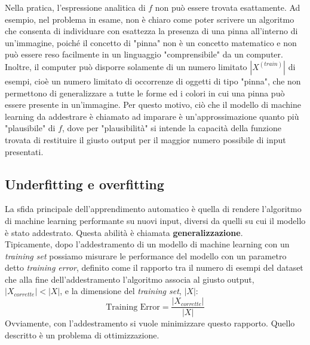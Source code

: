 Nella pratica, l'espressione analitica di $f$ non può essere trovata esattamente. Ad esempio, nel problema in esame, non è chiaro come poter scrivere un algoritmo che consenta di individuare con esattezza la presenza di una pinna all'interno di un'immagine, poiché il concetto di "pinna" non è un concetto matematico e non può essere reso facilmente in un linguaggio "comprensibile" da un computer. Inoltre, il computer può disporre solamente di un numero limitato $\left|X^{(train)}\right|$ di esempi, cioè un numero limitato di occorrenze di oggetti di tipo "pinna", che non permettono di generalizzare a tutte le forme ed i colori in cui una pinna può essere presente in un'immagine. Per questo motivo, ciò che il modello di machine learning da addestrare è chiamato ad imparare è un'approssimazione quanto più "plausibile" di $f$, dove per "plausibilità" si intende la capacità della funzione trovata di restituire il giusto output per il maggior numero possibile di input presentati.

\subsection{Underfitting e overfitting}
\label{overfitting}
La sfida principale dell'apprendimento automatico è quella di rendere l'algoritmo di machine learning performante su nuovi input, diversi da quelli su cui il modello è stato addestrato. Questa abilità è chiamata \textbf{generalizzazione}.\\

Tipicamente, dopo l'addestramento di un modello di machine learning con un \textit{training set} possiamo misurare le performance del modello con un parametro detto \textit{training error}, definito come il rapporto tra il numero di esempi del dataset che alla fine dell'addestramento l'algoritmo associa al giusto output, $\left|X_{corrette}\right|<\left|X\right|$, e la dimensione del \textit{training set}, $\left|X\right|$:
\[\text{Training Error}=\frac{\left|X_{corrette}\right|}{\left|X\right|}\]
Ovviamente, con l'addestramento si vuole minimizzare questo rapporto. Quello descritto è un problema di ottimizzazione.\\

